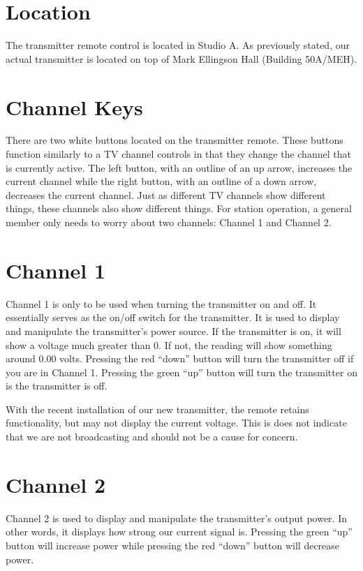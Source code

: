 \documentclass{witrman}
\begin{document}
\section{Location}
The transmitter remote control is located in Studio A. As previously stated, our
actual transmitter is located on top of Mark Ellingson Hall (Building 50A/MEH).

\section{Channel Keys}
There are two white buttons located on the transmitter remote. These buttons
function similarly to a TV channel controls in that they change the channel that
is currently active. The left button, with an outline of an up arrow, increases
the current channel while the right button, with an outline of a down arrow,
decreases the current channel. Just as different TV channels show different
things, these channels also show different things. For station operation, a
general member only needs to worry about two channels: Channel 1 and Channel 2.

\section{Channel 1}
Channel 1 is only to be used when turning the transmitter on and off. It
essentially serves as the on/off switch for the transmitter. It is used to
display and manipulate the transmitter’s power source. If the transmitter is on,
it will show a voltage much greater than 0. If not, the reading will show
something around 0.00 volts. Pressing the red ``down'' button will turn the
transmitter off if you are in Channel 1. Pressing the green ``up'' button will
turn the transmitter on is the transmitter is off.

With the recent installation of our new transmitter, the remote retains
functionality, but may not display the current voltage. This is does not
indicate that we are not broadcasting and should not be a cause for concern.

\section{Channel 2}
Channel 2 is used to display and manipulate the transmitter’s output power. In
other words, it displays how strong our current signal is. Pressing the green
``up'' button will increase power while pressing the red ``down'' button will
decrease power.
\end{document}
